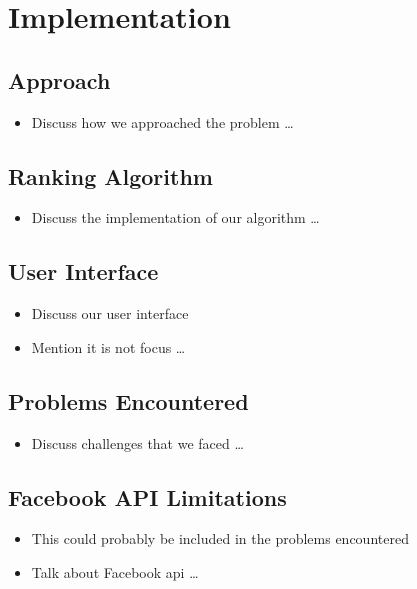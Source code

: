 
\chapter{Implementation}\label{ch:implementation}

\section{Approach}

\begin{itemize}
  \item Discuss how we approached the problem
\ldots
\end{itemize}

\section{Ranking Algorithm}

\begin{itemize}
  \item Discuss the implementation of our algorithm
\ldots
\end{itemize}

\section{User Interface}

\begin{itemize}
  \item Discuss our user interface
  \item Mention it is not focus
\ldots
\end{itemize}

\section{Problems Encountered}

\begin{itemize}
  \item Discuss challenges that we faced
\ldots
\end{itemize}

\section{Facebook API Limitations}

\begin{itemize}
  \item This could probably be included in the problems encountered
  \item Talk about Facebook api
\ldots
\end{itemize}

